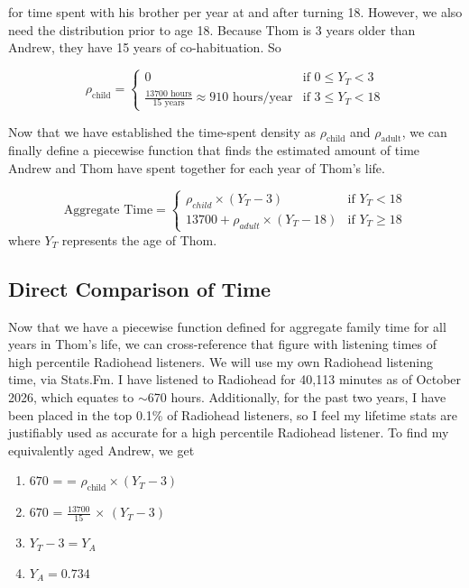 \documentclass{article}
\begin{document}
for time spent with his brother per year at and after turning 18. However, we also need the distribution prior to age 18. Because Thom is 3 years older than Andrew, they have 15 years of co-habituation. So

\[
\rho_{\text{child}} =
\begin{cases}
    0 & \text{if } 0\le Y_T < 3 \\
    \frac{13700 \text{ hours}}{15\text{ years}} \approx 910 \text{ hours/year} & \text{if } 3 \le Y_T < 18
\end{cases}
\]

Now that we have established the time-spent density as $\rho_{\text{child}}$ and $\rho_{\text{adult}}$, we can finally define a piecewise function that finds the estimated amount of time Andrew and Thom have spent together for each year of Thom's life.

\[
\text{Aggregate Time} = 
\begin{cases}
\rho_{child} \times  (Y_T-3)& \text{if } Y_T< 18 \\
13700 + \rho_{adult} \times (Y_T-18) & \text{if }  Y_T\ge 18
\end{cases}
\]
where $Y_T$ represents the age of Thom.

\subsection{Direct Comparison of Time}
Now that we have a piecewise function defined for aggregate family time for all years in Thom's life, we can cross-reference that figure with listening times of high percentile Radiohead listeners. We will use my own Radiohead listening time, via Stats.Fm. I have listened to Radiohead for 40,113 minutes as of October 2026, which equates to $\sim$670 hours. Additionally, for the past two years, I have been placed in the top 0.1\% of Radiohead listeners, so I feel my lifetime stats are justifiably used as accurate for a high percentile Radiohead listener. To find my equivalently aged Andrew, we get

\begin{enumerate}
    \item $670$ =  = $\rho_{\text{child}} \times (Y_T-3)$  
    \item $670$ = $\frac{13700}{15}$ $\times$ $(Y_T-3)$
    \item $Y_T-3=Y_A$ 
    \item $Y_A=0.734$
    
\end{enumerate}
\end{document}

